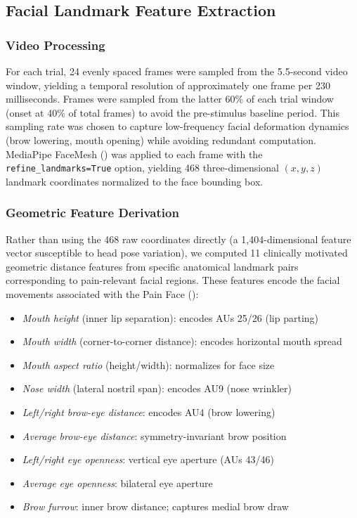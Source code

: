 \documentclass[10pt, twocolumn]{article}
\begin{document}
\subsection{Facial Landmark Feature Extraction}

\subsubsection{Video Processing}

For each trial, 24 evenly spaced frames were sampled from the 5.5-second video window,
yielding a temporal resolution of approximately one frame per 230 milliseconds.
Frames were sampled from the latter 60\% of each trial window (onset at 40\% of
total frames) to avoid the pre-stimulus baseline period. This sampling rate was
chosen to capture low-frequency facial deformation dynamics (brow lowering, mouth
opening) while avoiding redundant computation. MediaPipe FaceMesh
(\cite{Lugaresi2019}) was applied to each frame with the \texttt{refine\_landmarks=True}
option, yielding 468 three-dimensional $(x, y, z)$ landmark coordinates normalized to the
face bounding box.

\subsubsection{Geometric Feature Derivation}

Rather than using the 468 raw coordinates directly (a 1,404-dimensional feature vector
susceptible to head pose variation), we computed 11 clinically motivated geometric distance
features from specific anatomical landmark pairs corresponding to pain-relevant facial
regions. These features encode the facial movements associated with the Pain Face
(\cite{Prkachin2008}):

\begin{itemize}
  \item \textit{Mouth height} (inner lip separation): encodes AUs 25/26 (lip parting)
  \item \textit{Mouth width} (corner-to-corner distance): encodes horizontal mouth spread
  \item \textit{Mouth aspect ratio} (height/width): normalizes for face size
  \item \textit{Nose width} (lateral nostril span): encodes AU9 (nose wrinkler)
  \item \textit{Left/right brow-eye distance}: encodes AU4 (brow lowering)
  \item \textit{Average brow-eye distance}: symmetry-invariant brow position
  \item \textit{Left/right eye openness}: vertical eye aperture (AUs 43/46)
  \item \textit{Average eye openness}: bilateral eye aperture
  \item \textit{Brow furrow}: inner brow distance; captures medial brow draw
\end{itemize}
\end{document}
